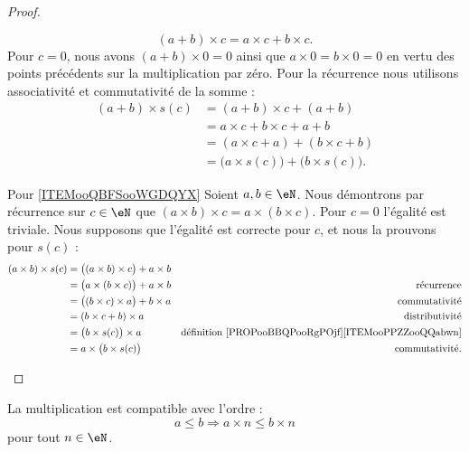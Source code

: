 \begin{proof}
\begin{subproof}
        \begin{equation}
            (a+b)\times c=a\times c+b\times c.
        \end{equation}
        Pour \( c=0\), nous avons \( (a+b)\times 0=0\) ainsi que \( a\times 0=b\times 0=0\) en vertu des points précédents sur la multiplication par zéro. Pour la récurrence nous utilisons associativité et commutativité de la somme :
        \begin{subequations}
            \begin{align}
                (a+b)\times s(c)&=(a+b)\times c+(a+b)\\
                &=a\times c+b\times c+a+b\\
                &=(a\times c +a)+(b\times c+b)\\
                &=\big( a\times s(c) \big)+\big( b\times s(c) \big).
            \end{align}
        \end{subequations}
    \item[Pour \ref{ITEMooQBFSooWGDQYX}]
        Soient \( a,b\in \eN\). Nous démontrons par récurrence sur \( c\in \eN\) que \( (a\times b)\times c=a\times (b\times c)\). Pour \( c=0\) l'égalité est triviale. Nous supposons que l'égalité est correcte pour \( c\), et nous la prouvons pour \( s(c)\) :
        \begin{subequations}
            \begin{align}
                (a\times b)\times s(c)&=\big( (a\times b)\times c \big)+a\times b\\
                &=\big( a\times (b\times c) \big)+a\times b &\text{récurrence}\\
                &=\big( (b\times c)\times a \big)+b\times a&\text{commutativité}\\
                &=(b\times c+b)\times a&\text{distributivité}\\
                &=\big( b\times s(c) \big)\times a&\text{définition \ref{PROPooBBQPooRgPOjf}\ref{ITEMooPPZZooQQabwn}}\\
                &=a\times \big( b\times s(c) \big)&\text{commutativité}.
            \end{align}
        \end{subequations}
    \end{subproof}
\end{proof}

\begin{lemma}
    La multiplication est compatible avec l'ordre : 
    \begin{equation}
        a\leq b\Rightarrow a\times n\leq b\times n
    \end{equation}
    pour tout \( n\in \eN\).
\end{lemma}

